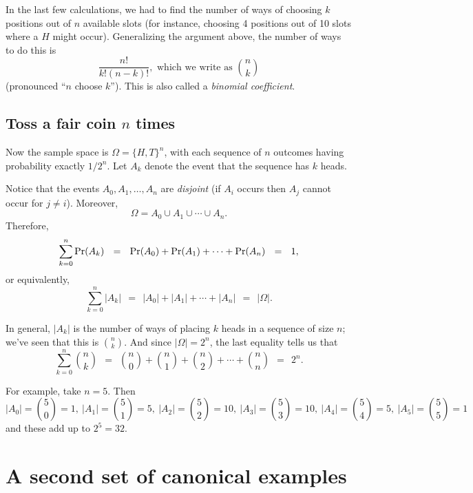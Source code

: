 In the last few calculations, we had to find the number of ways of choosing $k$ positions out of $n$ available slots (for instance, choosing 4 positions out of 10 slots where a $H$ might occur). Generalizing the argument above, the number of ways to do this is
$$ \frac{n!}{k!(n-k)!}, \mbox{\ which we write as\ } {n \choose k} $$
(pronounced ``$n$ choose $k$''). This is also called a {\it binomial coefficient}.

\subsection{Toss a fair coin $n$ times}

Now the sample space is $\Omega = \{H,T\}^n$, with each sequence of $n$ outcomes having probability exactly $1/2^n$. Let $A_k$ denote the event that the sequence has $k$ heads.

Notice that the events $A_0, A_1, \ldots, A_n$ are {\it disjoint} (if $A_i$ occurs then $A_j$ cannot occur for $j \neq i$). Moreover,
$$ \Omega = A_0 \cup A_1 \cup \cdots \cup A_n .$$
Therefore,
$$ \sum_{k=0}^n \pr(A_k) \ \ = \ \ \pr(A_0) + \pr(A_1) + \cdots + \pr(A_n) \ \ = \ \ 1 ,$$
or equivalently,
$$ \sum_{k=0}^n |A_k| \ \ = \ \ |A_0| + |A_1| + \cdots + |A_n| \ \ = \ \ |\Omega| .$$

In general, $|A_k|$ is the number of ways of placing $k$ heads in a sequence of size $n$; we've seen that this is ${n \choose k}$. And since $|\Omega| = 2^n$, the last equality tells us that
$$ \sum_{k=0}^n {n \choose k} \ \ = \ \ {n \choose 0} + {n \choose 1} + {n \choose 2} + \cdots + {n \choose n} \ \ = \ \ 2^n.$$

For example, take $n = 5$. Then
$$
|A_0| = {5 \choose 0} = 1, \  
|A_1| = {5 \choose 1} = 5, \ 
|A_2| = {5 \choose 2} = 10, \ 
|A_3| = {5 \choose 3} = 10, \ 
|A_4| = {5 \choose 4} = 5, \ 
|A_5| = {5 \choose 5} = 1
$$
and these add up to $2^5 = 32$.


\section{A second set of canonical examples}

